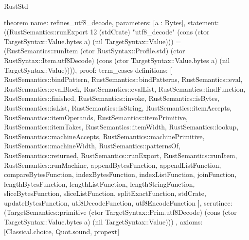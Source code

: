 \begin{lexlean}{RustStd}
\begin{semanticmodule}
theorem{
  name: refines_utf8_decode,
  parameters: [a : Bytes],
  statement: ((RustSemantics::runExport 12 (stdCrate) "utf8_decode" (cons (ctor TargetSyntax::Value.bytes a) (nil TargetSyntax::Value))) = (RustSemantics::runItem (ctor RustSyntax::Profile.std) (ctor RustSyntax::Item.utf8Decode) (cons (ctor TargetSyntax::Value.bytes a) (nil TargetSyntax::Value)))),
  proof: term_cases{
    definitions: [
      RustSemantics::bindPattern,
      RustSemantics::bindPatterns,
      RustSemantics::eval,
      RustSemantics::evalBlock,
      RustSemantics::evalList,
      RustSemantics::findFunction,
      RustSemantics::finished,
      RustSemantics::invoke,
      RustSemantics::isBytes,
      RustSemantics::isList,
      RustSemantics::isString,
      RustSemantics::itemAccepts,
      RustSemantics::itemOperands,
      RustSemantics::itemPrimitive,
      RustSemantics::itemTakes,
      RustSemantics::itemWidth,
      RustSemantics::lookup,
      RustSemantics::machineAccepts,
      RustSemantics::machinePrimitive,
      RustSemantics::machineWidth,
      RustSemantics::patternsOf,
      RustSemantics::returned,
      RustSemantics::runExport,
      RustSemantics::runItem,
      RustSemantics::runMachine,
      appendBytesFunction,
      appendListFunction,
      compareBytesFunction,
      indexBytesFunction,
      indexListFunction,
      joinFunction,
      lengthBytesFunction,
      lengthListFunction,
      lengthStringFunction,
      sliceBytesFunction,
      sliceListFunction,
      splitExactFunction,
      stdCrate,
      updateBytesFunction,
      utf8DecodeFunction,
      utf8EncodeFunction
    ],
    scrutinee: (TargetSemantics::primitive (ctor TargetSyntax::Prim.utf8Decode) (cons (ctor TargetSyntax::Value.bytes a) (nil TargetSyntax::Value)))
  },
  axioms: [Classical.choice, Quot.sound, propext]
}


\end{semanticmodule}
\end{lexlean}
